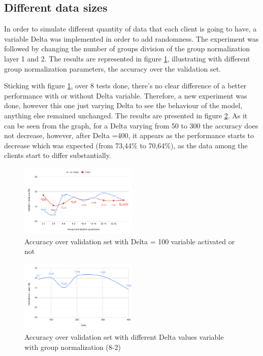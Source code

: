 \documentclass[twocolumn]{article}
\begin{document}
\subsection{Different data sizes}
In order to simulate different quantity of data that each client is going to have, a variable Delta was implemented in order to add randomness. The experiment was followed by changing the number of groups division of the group normalization layer 1 and 2. The results are represented in figure \ref{AccDiff}, illustrating with different group normalization parameters, the accuracy over the validation set. 

Sticking with figure \ref{AccDiff}, over 8 tests done, there's no clear difference of a better performance with or without Delta variable. Therefore, a new experiment was done, however this one just varying Delta to see the behaviour of the model, anything else remained unchanged. The results are presented in figure \ref{DeltaValue}. As it can be seen from the graph, for a Delta varying from 50 to 300 the accuracy does not decrease, however, after Delta =400, it appears as the performance starts to decrease which was expected (from 73,44\% to 70,64\%), as the data among the clients start to differ substantially.


\begin{figure}
    \centering
    \includegraphics[width=0.5\textwidth,height=.3\textheight]{groupnormalizationDeltaNoDelta.png}
    \caption{Accuracy over validation set with Delta = 100 variable activated or not}
     \label{AccDiff} 
\end{figure}

\begin{figure}
    \centering
    \includegraphics[width=0.5\textwidth,height=.3\textheight]{deltacomparison.png}
    \caption{Accuracy over validation set with different Delta values variable with group normalization (8-2)}
     \label{DeltaValue} 
\end{figure}
\end{document}

